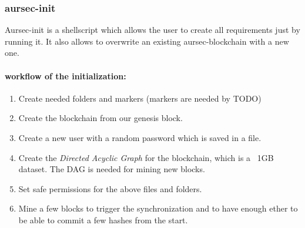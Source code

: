 \subsubsection{aursec-init}
Aursec-init is a shellscript which allows the user to create all requirements just by running it. It also allows to overwrite an existing aursec-blockchain with a new one.

\paragraph*{workflow of the initialization:}
\begin{enumerate}
	\item Create needed folders and markers (markers are needed by TODO)
	\item Create the blockchain from our genesis block.
	\item Create a new user with a random password which is saved in a file.
	\item Create the \emph{Directed Acyclic Graph} for the blockchain, which is a ~1GB dataset. The DAG is needed for mining new blocks. \cite{wiki:DAG}
	\item Set safe permissions for the above files and folders.
	\item Mine a few blocks to trigger the synchronization and to have enough ether to be able to commit a few hashes from the start. %
\end{enumerate}

